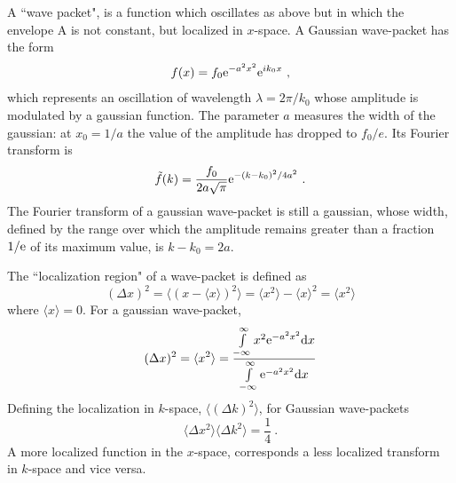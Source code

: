 \documentclass[12pt,a4paper]{article}
\newcommand{\dif}{\mathrm{d}}
\begin{document}
A ``wave packet", is a function which oscillates as above but in which the envelope A is not constant, but localized in $x$-space. A Gaussian wave-packet has the form
\begin{equation*}
f(x) = f_0 {\rm e}^{-a^2 x^2} {\rm e}^{ik_0x} ~,
\end{equation*}
which represents an oscillation of wavelength $\lambda = 2\pi/k_0$ whose amplitude is modulated by a gaussian function. The parameter $a$ measures the width of the gaussian: at $x_0 = 1/a$ the value of the amplitude has dropped to $f_0/e$. Its Fourier transform is
\begin{equation*}
\tilde{f}(k) = \frac{f_0}{2a\sqrt{\pi}} {\rm e}^{-(k-k_0)^2/4a^2} ~.
\end{equation*}
The Fourier transform of a gaussian wave-packet is still a gaussian, whose width, defined by the range over which the amplitude remains greater than a fraction $1/{\rm e}$ of its maximum value, is $k -k_0 = 2a$.  

The ``localization region" of a wave-packet is defined as
\begin{equation}
(\Delta x)^2 = \langle(x -\langle x\rangle)^2\rangle = \langle x^2\rangle -\langle x\rangle^2 =  \langle x^2\rangle
\end{equation}
where $\langle x\rangle = 0$. For a gaussian wave-packet, 
\begin{equation*}
(\Delta x)^2 = \langle x^2\rangle = \dfrac{\int\limits_{-\infty}^{\infty} x^2 {\rm e}^{-a^2 x^2} \dif x}{\int\limits_{-\infty}^{\infty} {\rm e}^{-a^2 x^2} \dif x}
\end{equation*}
Defining the localization in $k$-space, $\langle (\Delta k)^2 \rangle$, for Gaussian wave-packets
\begin{equation*}
\langle \Delta x^2\rangle \langle \Delta k^2\rangle = \frac{1}{4} ~.
\end{equation*}
A more localized function in the $x$-space, corresponds a less localized transform in $k$-space and vice versa.
\end{document}
